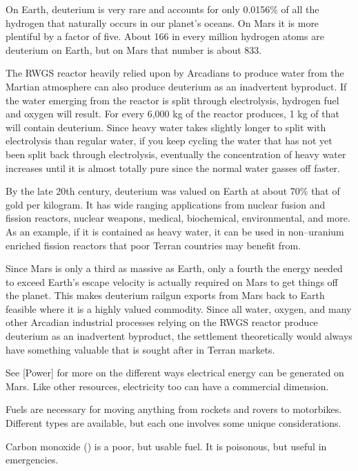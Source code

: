 On Earth, deuterium is very rare and accounts for only 0.0156\% of all the hydrogen that naturally occurs in our planet's oceans. On Mars it is more plentiful by a factor of five. About 166 in every million hydrogen atoms are deuterium on Earth, but on Mars that number is about 833. 

The RWGS reactor heavily relied upon by Arcadians to produce water from the Martian atmosphere can also produce deuterium as an inadvertent byproduct. If the water emerging from the reactor is split through electrolysis, hydrogen fuel and oxygen will result. For every 6,000 kg of  the reactor produces, 1 kg of that will contain deuterium. Since heavy water takes slightly longer to split with electrolysis than regular water, if you keep cycling the water that has not yet been split back through electrolysis, eventually the concentration of heavy water increases until it is almost totally pure since the normal water gasses off faster.

By the late 20th century, deuterium was valued on Earth at about 70\% that of gold per kilogram. It has wide ranging applications from nuclear fusion and fission reactors, nuclear weapons, medical, biochemical, environmental, and more. As an example, if it is contained as heavy water, it can be used in non--uranium enriched fission reactors that poor Terran countries may benefit from.

Since Mars is only a third as massive as Earth, only a fourth the energy needed to exceed Earth's escape velocity is actually required on Mars to get things off the planet. This makes deuterium railgun exports from Mars back to Earth feasible where it is a highly valued commodity. Since all water, oxygen, and many other Arcadian industrial processes relying on the RWGS reactor produce deuterium as an inadvertent byproduct, the settlement theoretically would always have something valuable that is sought after in Terran markets.

See [Power] for more on the different ways electrical energy can be generated on Mars. Like other resources, electricity too can have a commercial dimension.

Fuels are necessary for moving anything from rockets and rovers to motorbikes. Different types are available, but each one involves some unique considerations.

Carbon monoxide () is a poor, but usable fuel. It is poisonous, but useful in emergencies.

